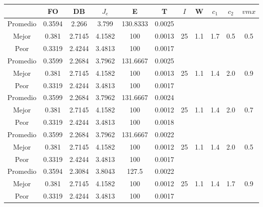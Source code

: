 \begin{table}[h!]
    \footnotesize
    \begin{center}
        \begin{tabular}{|c|c|c|c|c|c|c|c|c|c|c|}
        \hline
            & {\bf FO} & {\bf DB} & $J_e$ & {\bf E} & {\bf T} & $I$ & W & $c_1$ & $c_2$ & $vmx$ \\
        \hline
        \hline
            Promedio  & 0.3594 & 2.266 & 3.799 & 130.8333 & 0.0025 &  &  &  &  & \\
            \cline{1-6}
            Mejor & 0.381 & 2.7145  & 4.1582 & 100 & 0.0013 & 25 & 1.1 & 1.7 & 0.5 & 0.5\\
            \cline{1-6}
            Peor & 0.3319 & 2.4244  & 3.4813 & 100 & 0.0017 &  &  &  &  & \\
        \hline
        \hline
            Promedio  & 0.3599 & 2.2684 & 3.7962 & 131.6667 & 0.0025 &  &  &  &  & \\
            \cline{1-6}
            Mejor & 0.381 & 2.7145  & 4.1582 & 100 & 0.0013 & 25 & 1.1 & 1.4 & 2.0 & 0.9\\
            \cline{1-6}
            Peor & 0.3319 & 2.4244  & 3.4813 & 100 & 0.0017 &  &  &  &  & \\
        \hline
        \hline
            Promedio  & 0.3599 & 2.2684 & 3.7962 & 131.6667 & 0.0024 &  &  &  &  & \\
            \cline{1-6}
            Mejor & 0.381 & 2.7145  & 4.1582 & 100 & 0.0012 & 25 & 1.1 & 1.4 & 2.0 & 0.7\\
            \cline{1-6}
            Peor & 0.3319 & 2.4244  & 3.4813 & 100 & 0.0018 &  &  &  &  & \\
        \hline
        \hline
            Promedio  & 0.3599 & 2.2684 & 3.7962 & 131.6667 & 0.0022 &  &  &  &  & \\
            \cline{1-6}
            Mejor & 0.381 & 2.7145  & 4.1582 & 100 & 0.0012 & 25 & 1.1 & 1.4 & 2.0 & 0.5\\
            \cline{1-6}
            Peor & 0.3319 & 2.4244  & 3.4813 & 100 & 0.0017 &  &  &  &  & \\
        \hline
        \hline
            Promedio  & 0.3594 & 2.3084 & 3.8043 & 127.5 & 0.0022 &  &  &  &  & \\
            \cline{1-6}
            Mejor & 0.381 & 2.7145  & 4.1582 & 100 & 0.0012 & 25 & 1.1 & 1.4 & 1.7 & 0.9\\
            \cline{1-6}
            Peor & 0.3319 & 2.4244  & 3.4813 & 100 & 0.0017 &  &  &  &  & \\

\end{tabular}
\end{center}
\end{table}
